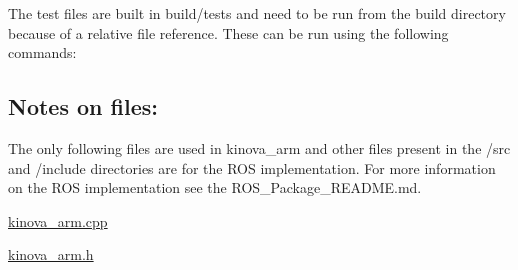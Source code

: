 The test files are built in build/tests and need to be run from the build directory because of a relative file reference. These can be run using the following commands\+: 


\subsection*{Notes on files\+:}

The only following files are used in kinova\+\_\+arm and other files present in the /src and /include directories are for the R\+OS implementation. For more information on the R\+OS implementation see the R\+O\+S\+\_\+\+Package\+\_\+\+R\+E\+A\+D\+M\+E.\+md.


\begin{DoxyItemize}
\item \hyperlink{kinova__arm_8cpp_source}{kinova\+\_\+arm.\+cpp}
\item \hyperlink{kinova__arm_8h_source}{kinova\+\_\+arm.\+h} 
\end{DoxyItemize}